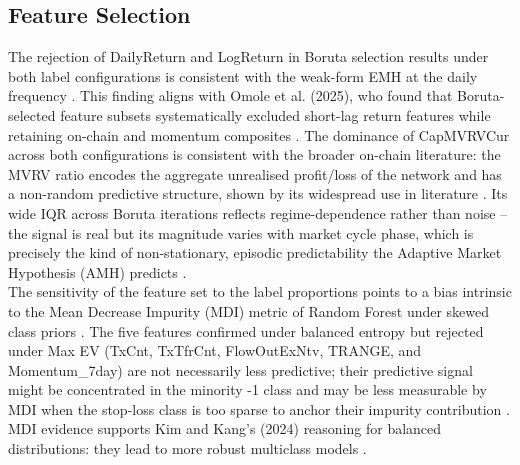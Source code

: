 \subsection{Feature Selection}
The rejection of DailyReturn and LogReturn in Boruta selection results under both label configurations is consistent with the weak-form EMH at the daily frequency \cite{yiMarketEfficiencyCryptocurrency2023}. This finding aligns with Omole et al. (2025), who found that Boruta-selected feature subsets systematically excluded short-lag return features while retaining on-chain and momentum composites \cite{omoleUsingMachineDeep2025}. The dominance of CapMVRVCur across both configurations is consistent with the broader on-chain literature: the MVRV ratio encodes the aggregate unrealised profit/loss of the network and has a non-random predictive structure, shown by its widespread use in literature \cite{dubeyBitcoinPriceDirection2025, 230304642v1ForecastingMovements, palazziNetworkFundamentalsMacroFinancial2026, kanzariContextadaptiveIntelligentAgents2025}. Its wide IQR across Boruta iterations reflects regime-dependence rather than noise – the signal is real but its magnitude varies with market cycle phase, which is precisely the kind of non-stationary, episodic predictability the Adaptive Market Hypothesis (AMH) predicts \cite{karasinskiPredictabilityHighFrequencyReturns2025}.\\
The sensitivity of the feature set to the label proportions points to a bias intrinsic to the Mean Decrease Impurity (MDI) metric of Random Forest under skewed class priors \cite{stroblBiasRandomForest2007}. The five features confirmed under balanced entropy but rejected under Max EV (TxCnt, TxTfrCnt, FlowOutExNtv, TRANGE, and Momentum\_7day) are not necessarily less predictive; their predictive signal might be concentrated in the minority -1 class and may be less measurable by MDI when the stop-loss class is too sparse to anchor their impurity contribution \cite{HowAreFeature_importances10:28:55+00:00, stroblBiasRandomForest2007, janitzaAUCbasedPermutationVariable2013}. MDI evidence supports Kim and Kang's (2024) reasoning for balanced distributions: they lead to more robust multiclass models \cite{StockPricePrediction}.
